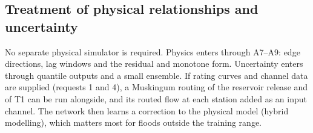 \subsection*{Treatment of physical relationships and uncertainty}
No separate physical simulator is required. Physics enters through A7--A9: edge directions, lag
windows and the residual and monotone form. Uncertainty enters through quantile outputs and a
small ensemble. If rating curves and channel data are supplied (requests 1 and 4), a Muskingum
routing of the reservoir release and of T1 can be run alongside, and its routed flow at each station
added as an input channel. The network then learns a correction to the physical model (hybrid
modelling), which matters most for floods outside the training range.
